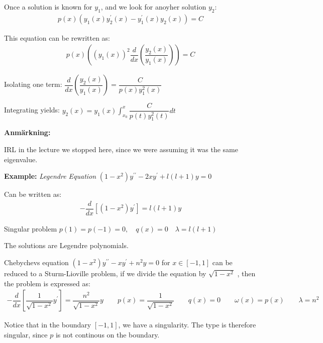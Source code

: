 \par\bigskip
\noindent Once a solution is known for $y_1$, and we look for anoyher solution $y_2$:
\begin{equation*}
  \begin{gathered}
    p(x)(y_1(x)y_2^{\prime}(x)-y_1^{\prime}(x)y_2(x)) = C
  \end{gathered}
\end{equation*}\par
\noindent This equation can be rewritten as:
\begin{equation*}
  \begin{gathered}
    p(x)\left((y_1(x))^2\dfrac{d}{dx}\left(\dfrac{y_2(x)}{y_1(x)}\right)\right) = C
  \end{gathered}
\end{equation*}\par
\noindent Isolating one term: $\dfrac{d}{dx}\left(\dfrac{y_2(x)}{y_1(x)}\right) = \dfrac{C}{p(x)y_1^2(x)}$\par
\noindent Integrating yields: $y_2(x) = y_1(x)\int_{x_0}^{x}\dfrac{C}{p(t)y_1^2(t)}dt$
\par\bigskip
\noindent\textbf{Anmärkning:}\par
\noindent IRL in the lecture we stopped here, since we were assuming it was the same eigenvalue. 
\par\bigskip
\noindent\textbf{Example:} \textit{Legendre Equation} $(1-x^2)y^{\prime\prime}-2xy^{\prime}+l(l+1)y=0$\par
\noindent Can be written as:
\begin{equation*}
  \begin{gathered}
    -\dfrac{d}{dx}\left[(1-x^2)y^{\prime}\right] = l(l+1)y
  \end{gathered}
\end{equation*}\par
\noindent Singular problem $p(1) = p(-1) = 0,\quad q(x) = 0\quad \lambda = l(l+1)$\par
\noindent The solutions are Legendre polynomials.
\par\bigskip
\noindent Chebychevs equation $(1-x^2)y^{\prime\prime}-xy^{\prime}+n^2y=0$  for $x\in[-1,1]$ can be reduced to a Sturm-Lioville problem, if we divide the equation by $\sqrt{1-x^2}$ , then the problem is expressed as:
\begin{equation*}
  \begin{gathered}
    -\dfrac{d}{dx}\left[\dfrac{1}{\sqrt{1-x^2}}y^{\prime}\right] = \dfrac{n^2}{\sqrt{1-x^2}}y\qquad p(x) = \dfrac{1}{\sqrt{1-x^2}}\qquad q(x) = 0\qquad\omega(x) = p(x)\qquad \lambda = n^2
  \end{gathered}
\end{equation*}\par
\noindent Notice that in the boundary $[-1,1]$, we have a singularity. The type is therefore singular, since $p$  is not continous on the boundary.
